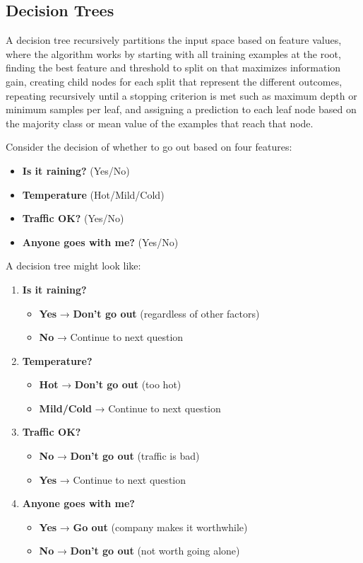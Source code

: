 \subsection{Decision Trees}

A decision tree recursively partitions the input space based on feature values, where the algorithm works by starting with all training examples at the root, finding the best feature and threshold to split on that maximizes information gain, creating child nodes for each split that represent the different outcomes, repeating recursively until a stopping criterion is met such as maximum depth or minimum samples per leaf, and assigning a prediction to each leaf node based on the majority class or mean value of the examples that reach that node.

\begin{example}
Consider the decision of whether to go out based on four features:
\begin{itemize}
    \item \textbf{Is it raining?} (Yes/No)
    \item \textbf{Temperature} (Hot/Mild/Cold)
    \item \textbf{Traffic OK?} (Yes/No)
    \item \textbf{Anyone goes with me?} (Yes/No)
\end{itemize}

A decision tree might look like:
\begin{enumerate}
    \item \textbf{Is it raining?}
    \begin{itemize}
        \item \textbf{Yes} → \textbf{Don't go out} (regardless of other factors)
        \item \textbf{No} → Continue to next question
    \end{itemize}
    \item \textbf{Temperature?}
    \begin{itemize}
        \item \textbf{Hot} → \textbf{Don't go out} (too hot)
        \item \textbf{Mild/Cold} → Continue to next question
    \end{itemize}
    \item \textbf{Traffic OK?}
    \begin{itemize}
        \item \textbf{No} → \textbf{Don't go out} (traffic is bad)
        \item \textbf{Yes} → Continue to next question
    \end{itemize}
    \item \textbf{Anyone goes with me?}
    \begin{itemize}
        \item \textbf{Yes} → \textbf{Go out} (company makes it worthwhile)
        \item \textbf{No} → \textbf{Don't go out} (not worth going alone)
    \end{itemize}
\end{enumerate}


\end{example}

